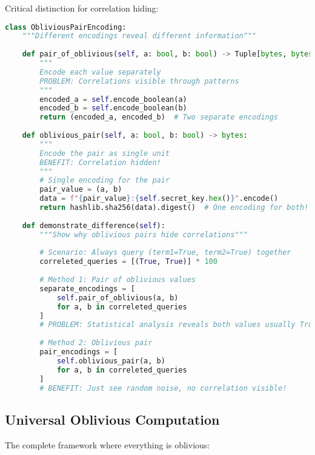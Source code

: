 Critical distinction for correlation hiding:

\begin{lstlisting}[language=Python, caption={Two approaches to encoding pairs}]
class ObliviousPairEncoding:
    """Different encodings reveal different information"""
    
    def pair_of_oblivious(self, a: bool, b: bool) -> Tuple[bytes, bytes]:
        """
        Encode each value separately
        PROBLEM: Correlations visible through patterns
        """
        encoded_a = self.encode_boolean(a)
        encoded_b = self.encode_boolean(b)
        return (encoded_a, encoded_b)  # Two separate encodings
    
    def oblivious_pair(self, a: bool, b: bool) -> bytes:
        """
        Encode the pair as single unit
        BENEFIT: Correlation hidden!
        """
        # Single encoding for the pair
        pair_value = (a, b)
        data = f"{pair_value}:{self.secret_key.hex()}".encode()
        return hashlib.sha256(data).digest()  # One encoding for both!
    
    def demonstrate_difference(self):
        """Show why oblivious pairs hide correlations"""
        
        # Scenario: Always query (term1=True, term2=True) together
        correleted_queries = [(True, True)] * 100
        
        # Method 1: Pair of oblivious values
        separate_encodings = [
            self.pair_of_oblivious(a, b) 
            for a, b in correleted_queries
        ]
        # PROBLEM: Statistical analysis reveals both values usually True
        
        # Method 2: Oblivious pair
        pair_encodings = [
            self.oblivious_pair(a, b)
            for a, b in correleted_queries
        ]
        # BENEFIT: Just see random noise, no correlation visible!
\end{lstlisting}

\subsection{Universal Oblivious Computation}

The complete framework where everything is oblivious:

